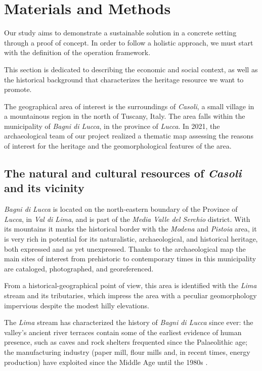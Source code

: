 \documentclass[sustainability,article,submit,pdftex,moreauthors]{Definitions/mdpi}
\begin{document}
\section{Materials and Methods}

Our study aims to demonstrate a sustainable solution in a concrete setting through a proof of concept. In order to follow a holistic approach, we must start with the definition of the operation framework.

This section is dedicated to describing the economic and social context, as well as the historical background that characterizes the heritage resource we want to promote.

The geographical area of interest is the surroundings of \emph{Casoli}, a small village in a mountainous region in the north of Tuscany, Italy. The area falls within the municipality of \emph{Bagni di Lucca}, in the province of \emph{Lucca}. In 2021, the archaeological team of our project realized a thematic map assessing the reasons of interest for the heritage and the geomorphological features of the area.

\subsection{The natural and cultural resources of \emph{Casoli} and its vicinity}

\emph{Bagni di Lucca} is located on the north-eastern boundary of the Province of \emph{Lucca}, in \emph{Val di Lima}, and is part of the \textit{Media Valle del Serchio} district. With its mountains it marks the historical border with the \textit{Modena} and \textit{Pistoia} area, it is very rich in potential for its naturalistic, archaeological, and historical heritage, both expressed and as yet unexpressed. Thanks to the archaeological map the main sites of interest from prehistoric to contemporary times in this municipality are cataloged, photographed, and georeferenced.

From a historical-geographical point of view, this area is identified with the \emph{Lima} stream and its tributaries, which impress the area with a peculiar geomorphology impervious despite the modest hilly elevations.

The \emph{Lima} stream has characterized the history of \emph{Bagni di Lucca} since ever: the valley's ancient river terraces contain some of the earliest evidence of human presence, such as caves and rock shelters frequented since the Palaeolithic age; the manufacturing industry (paper mill, flour mills and, in recent times, energy production) have exploited since the Middle Age until the 1980s \cite{men76, bed05, ser21}.
 
\end{document}
